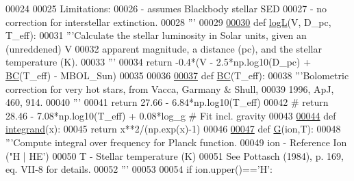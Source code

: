\begin{DoxyCode}
00024 \textcolor{stringliteral}{}
00025 \textcolor{stringliteral}{   Limitations: }
00026 \textcolor{stringliteral}{    - assumes Blackbody stellar SED}
00027 \textcolor{stringliteral}{    - no correction for interstellar extinction.}
00028 \textcolor{stringliteral}{'''}
00029 
\hypertarget{stellar_8py_source_l00030}{}\hyperlink{namespacepyneb_1_1utils_1_1stellar_ac8707dcb0395c96cc4053e1f46f2c02f}{00030} \textcolor{keyword}{def }\hyperlink{namespacepyneb_1_1utils_1_1stellar_ac8707dcb0395c96cc4053e1f46f2c02f}{logL}(V, D\_pc, T\_eff):
00031     \textcolor{stringliteral}{'''Calculate the stellar luminosity in Solar units, given an (unreddened) V }
00032 \textcolor{stringliteral}{       apparent magnitude, a distance (pc), and the stellar temperature (K).}
00033 \textcolor{stringliteral}{    '''}
00034     \textcolor{keywordflow}{return} -0.4*(V - 2.5*np.log10(D\_pc) + \hyperlink{namespacepyneb_1_1utils_1_1stellar_a6a17bb8af2c6325b342af54c660d9aab}{BC}(T\_eff) - MBOL\_Sun)
00035 
00036 
\hypertarget{stellar_8py_source_l00037}{}\hyperlink{namespacepyneb_1_1utils_1_1stellar_a6a17bb8af2c6325b342af54c660d9aab}{00037} \textcolor{keyword}{def }\hyperlink{namespacepyneb_1_1utils_1_1stellar_a6a17bb8af2c6325b342af54c660d9aab}{BC}(T\_eff):
00038     \textcolor{stringliteral}{'''Bolometric correction for very hot stars, from Vacca, Garmany & Shull,}
00039 \textcolor{stringliteral}{       1996, ApJ, 460, 914.}
00040 \textcolor{stringliteral}{    '''}
00041     \textcolor{keywordflow}{return} 27.66 - 6.84*np.log10(T\_eff)
00042 \textcolor{comment}{#    return 28.46 - 7.08*np.log10(T\_eff) + 0.08*log\_g  # Fit incl. gravity}
00043 
\hypertarget{stellar_8py_source_l00044}{}\hyperlink{namespacepyneb_1_1utils_1_1stellar_a46d2fd9e00f4e0605c2e8c72b904d532}{00044} \textcolor{keyword}{def }\hyperlink{namespacepyneb_1_1utils_1_1stellar_a46d2fd9e00f4e0605c2e8c72b904d532}{integrand}(x):
00045     \textcolor{keywordflow}{return} x**2/(np.exp(x)-1)
00046 
\hypertarget{stellar_8py_source_l00047}{}\hyperlink{namespacepyneb_1_1utils_1_1stellar_a8a89c2764d0517d414e8da6c2031d601}{00047} \textcolor{keyword}{def }\hyperlink{namespacepyneb_1_1utils_1_1stellar_a8a89c2764d0517d414e8da6c2031d601}{G}(ion,T):
00048     \textcolor{stringliteral}{'''Compute integral over frequency for Planck function.}
00049 \textcolor{stringliteral}{       ion - Reference Ion ("H | HE')}
00050 \textcolor{stringliteral}{       T   - Stellar temperature (K)}
00051 \textcolor{stringliteral}{       See Pottasch (1984), p. 169, eq. VII-8 for details. }
00052 \textcolor{stringliteral}{    '''}
00053 
00054     \textcolor{keywordflow}{if} ion.upper()==\textcolor{stringliteral}{'H'}:

\end{DoxyCode}
